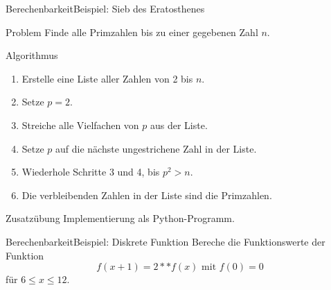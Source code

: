\documentclass[xelatex,aspectratio=169]{beamer}
\begin{document}
\begin{frame}{Berechenbarkeit}{Beispiel: Sieb des Eratosthenes}
  \begin{block}{Problem}
    Finde alle Primzahlen bis zu einer gegebenen Zahl $n$.
  \end{block}

  \begin{block}{Algorithmus}
    \begin{enumerate}
      \item Erstelle eine Liste aller Zahlen von 2 bis $n$.
      \item Setze $p = 2$.
      \item Streiche alle Vielfachen von $p$ aus der Liste.
      \item Setze $p$ auf die nächste ungestrichene Zahl in der Liste.
      \item Wiederhole Schritte 3 und 4, bis $p^2 > n$.
      \item Die verbleibenden Zahlen in der Liste sind die Primzahlen.
    \end{enumerate}
  \end{block}

  \begin{exampleblock}{Zusatzübung}
    Implementierung als Python-Programm.
  \end{exampleblock}
\end{frame}

\begin{frame}{Berechenbarkeit}{Beispiel: Diskrete Funktion}
  Bereche die Funktionswerte der Funktion
  \[
    f\left(x+1\right) = 2 ** f\left(x\right) \mbox{ mit } f\left(0\right) = 0
  \]
  für \( 6 \leq x \leq 12 \).


\end{frame}
\end{document}
